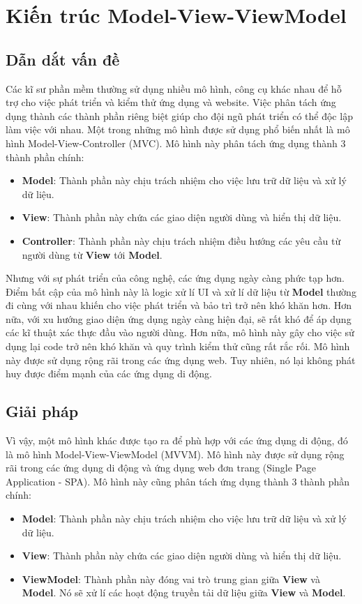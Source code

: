 \documentclass[../DoAn.tex]{subfiles}
\begin{document}
\section{Kiến trúc Model-View-ViewModel}
\label{section:mvvm}


\subsection{Dẫn dắt vấn đề}
\label{subsection:mvvm-problem}
Các kĩ sư phần mềm thường sử dụng nhiều mô hình, công cụ khác nhau để hỗ trợ cho việc phát triển và kiểm thử ứng dụng và website. Việc phân tách ứng dụng thành các thành phần riêng biệt giúp cho đội ngũ phát triển có thể độc lập làm việc với nhau. Một trong những mô hình được sử dụng phổ biến nhất là mô hình Model-View-Controller (MVC). Mô hình này phân tách ứng dụng thành 3 thành phần chính:
\begin{itemize}
    \item \textbf{Model}: Thành phần này chịu trách nhiệm cho việc lưu trữ dữ liệu và xử lý dữ liệu.
    \item \textbf{View}: Thành phần này chứa các giao diện người dùng và hiển thị dữ liệu.
    \item \textbf{Controller}: Thành phần này chịu trách nhiệm điều hướng các yêu cầu từ người dùng từ \textbf{View} tới \textbf{Model}.
\end{itemize}
Nhưng với sự phát triển của công nghệ, các ứng dụng ngày càng phức tạp hơn. Điểm bất cập của mô hình này là logic xử lí UI và xử lí dữ liệu từ \textbf{Model} thường đi cùng với nhau khiến cho việc phát triển và bảo trì trở nên khó khăn hơn. Hơn nữa, với xu hướng giao diện ứng dụng ngày càng hiện đại, sẽ rất khó để áp dụng các kĩ thuật xác thực đầu vào người dùng. Hơn nữa, mô hình này gây cho việc sử dụng lại code trở nên khó khăn và quy trình kiểm thử cũng rất rắc rối. Mô hình này được sử dụng rộng rãi trong các ứng dụng web. Tuy nhiên, nó lại không phát huy được điểm mạnh của các ứng dụng di động.


\subsection{Giải pháp}
\label{subsection:mvvm-solution}
Vì vậy, một mô hình khác được tạo ra để phù hợp với các ứng dụng di động, đó là mô hình Model-View-ViewModel (MVVM). Mô hình này được sử dụng rộng rãi trong các ứng dụng di động và ứng dụng web đơn trang (Single Page Application - SPA). Mô hình này cũng phân tách ứng dụng thành 3 thành phần chính:
\begin{itemize}
    \item \textbf{Model}: Thành phần này chịu trách nhiệm cho việc lưu trữ dữ liệu và xử lý dữ liệu.
    \item \textbf{View}: Thành phần này chứa các giao diện người dùng và hiển thị dữ liệu.
    \item \textbf{ViewModel}: Thành phần này đóng vai trò trung gian giữa \textbf{View} và \textbf{Model}. Nó sẽ xử lí các hoạt động truyền tải dữ liệu giữa \textbf{View} và \textbf{Model}.
\end{itemize}
\vfill
\break
\end{document}
